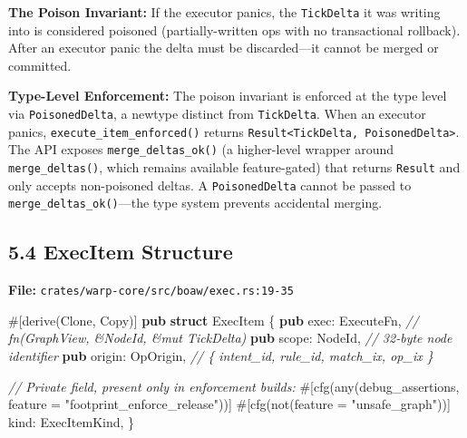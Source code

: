 \documentclass[
]{book}
\newenvironment{Shaded}{}{}
\newcommand{\AttributeTok}[1]{\textcolor[rgb]{0.49,0.56,0.16}{#1}}
\newcommand{\BuiltInTok}[1]{\textcolor[rgb]{0.00,0.50,0.00}{#1}}
\newcommand{\CommentTok}[1]{\textcolor[rgb]{0.38,0.63,0.69}{\textit{#1}}}
\newcommand{\KeywordTok}[1]{\textcolor[rgb]{0.00,0.44,0.13}{\textbf{#1}}}
\newcommand{\NormalTok}[1]{#1}
\newcommand{\OperatorTok}[1]{\textcolor[rgb]{0.40,0.40,0.40}{#1}}
\newcommand{\StringTok}[1]{\textcolor[rgb]{0.25,0.44,0.63}{#1}}
\begin{document}
\textbf{The Poison Invariant:} If the executor panics, the \texttt{TickDelta}
it was writing into is considered poisoned (partially-written ops with no
transactional rollback). After an executor panic the delta must be
discarded---it cannot be merged or committed.

\textbf{Type-Level Enforcement:} The poison invariant is enforced at the type
level via \texttt{PoisonedDelta}, a newtype distinct from \texttt{TickDelta}.
When an executor panics, \texttt{execute\_item\_enforced()} returns
\texttt{Result<TickDelta, PoisonedDelta>}. The API exposes \texttt{merge\_deltas\_ok()}
(a higher-level wrapper around \texttt{merge\_deltas()}, which remains available
feature-gated) that returns \texttt{Result} and only accepts non-poisoned deltas.
A \texttt{PoisonedDelta} cannot be passed to \texttt{merge\_deltas\_ok()}---the
type system prevents accidental merging.

\subsection{5.4 ExecItem Structure}\label{execitem-structure}

\textbf{File:} \texttt{crates/warp-core/src/boaw/exec.rs:19-35}

\begin{Shaded}
\begin{Highlighting}[]
\AttributeTok{\#[}\NormalTok{derive}\AttributeTok{(}\BuiltInTok{Clone}\OperatorTok{,} \BuiltInTok{Copy}\AttributeTok{)]}
\KeywordTok{pub} \KeywordTok{struct}\NormalTok{ ExecItem }\OperatorTok{\{}
    \KeywordTok{pub}\NormalTok{ exec}\OperatorTok{:}\NormalTok{ ExecuteFn}\OperatorTok{,}     \CommentTok{// fn(GraphView, \&NodeId, \&mut TickDelta)}
    \KeywordTok{pub}\NormalTok{ scope}\OperatorTok{:}\NormalTok{ NodeId}\OperatorTok{,}       \CommentTok{// 32{-}byte node identifier}
    \KeywordTok{pub}\NormalTok{ origin}\OperatorTok{:}\NormalTok{ OpOrigin}\OperatorTok{,}    \CommentTok{// \{ intent\_id, rule\_id, match\_ix, op\_ix \}}

    \CommentTok{// Private field, present only in enforcement builds:}
    \AttributeTok{\#[}\NormalTok{cfg}\AttributeTok{(}\NormalTok{any}\AttributeTok{(}\NormalTok{debug\_assertions}\OperatorTok{,}\NormalTok{ feature }\OperatorTok{=} \StringTok{"footprint\_enforce\_release"}\AttributeTok{))]}
    \AttributeTok{\#[}\NormalTok{cfg}\AttributeTok{(}\NormalTok{not}\AttributeTok{(}\NormalTok{feature }\OperatorTok{=} \StringTok{"unsafe\_graph"}\AttributeTok{))]}
\NormalTok{    kind}\OperatorTok{:}\NormalTok{ ExecItemKind}\OperatorTok{,}
\OperatorTok{\}}
\end{Highlighting}
\end{Shaded}
\end{document}
